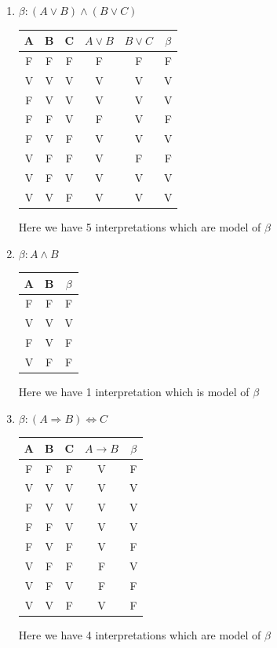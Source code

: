 \documentclass[a4paper,10pt]{article}
\begin{document}
\begin {enumerate}
 \item $\beta : (A \vee B) \wedge(B \vee C)$
 \begin{center}

 \begin{tabular}{|c|c|c|c|c||c|}
	\hline
	A & B & C & $A \vee B$ & $B \vee C$& $\beta$ \\
	\hline 
	F & F & F & F & F & F \\
	\hline
	V & V & V & V & V & V \\
	\hline
	F & V & V & V & V & V \\
	\hline
	F & F & V & F & V & F \\
	\hline
	F & V & F & V & V & V \\
	\hline
	V & F & F & V & F & F \\
	\hline
	V & F & V & V & V & V \\
	\hline
	V & V & F & V & V & V \\
 	\hline
 \end{tabular}
 
 \end{center}
 Here we have 5 interpretations which are model of $\beta$
 \item $\beta : A \wedge B$\\
 
 \begin{center}

 \begin{tabular}{|c|c||c|}
	\hline
	A & B & $\beta$ \\
	\hline 
	F & F & F  \\
	\hline
	V & V & V  \\
	\hline
	F & V & F \\
	\hline
	V & F & F \\
	\hline
 \end{tabular}
  
 \end{center}
 
 Here we have 1 interpretation which is model of $\beta$
\item $\beta : (A \Rightarrow B) \Leftrightarrow C $


 \begin{center}

 \begin{tabular}{|c|c|c|c||c|}
	\hline
	A & B & C & $A \rightarrow B$ & $\beta$ \\
	\hline 
	F & F & F & V & F \\
	\hline
	V & V & V & V & V \\
	\hline
	F & V & V & V & V \\
	\hline
	F & F & V & V & V  \\
	\hline
	F & V & F & V & F \\
	\hline
	V & F & F & F & V \\
	\hline
	V & F & V & F & F \\
	\hline
	V & V & F & V & F \\
 	\hline
 \end{tabular}
  
 \end{center}
 Here we have 4 interpretations which are model of $\beta$
\end {enumerate}
\end{document}
